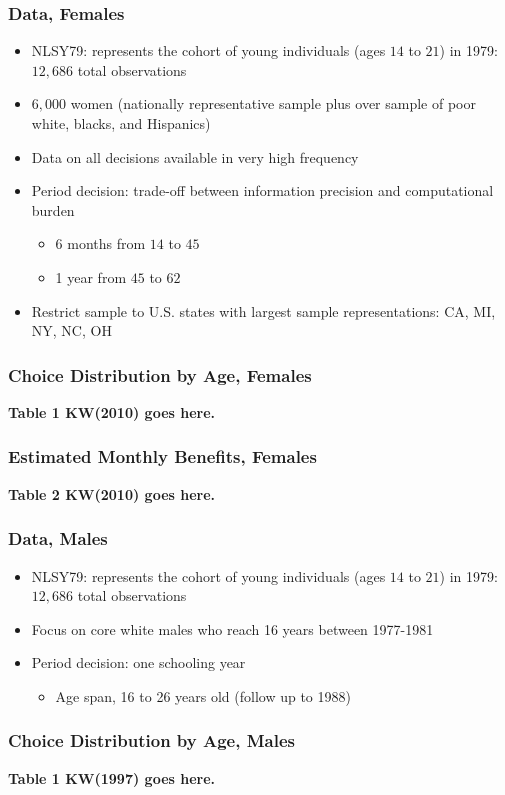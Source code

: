\begin{frame}
	\frametitle{Data, Females}
		\begin{itemize}
			\item NLSY79: represents the cohort of young individuals (ages $14$ to $21$) in 1979: $12,686$ total observations 
			\item $6,000$ women (nationally representative sample plus over sample of poor white, blacks, and Hispanics)
			\item Data on all decisions available in very high frequency
			\item Period decision: trade-off between information precision and computational burden
			\begin{itemize}
				\item 6 months from $14$ to $45$
				\item 1 year from $45$ to $62$
			\end{itemize}						
			\item Restrict sample to U.S. states with largest sample representations: CA, MI, NY, NC, OH
		\end{itemize}
\end{frame}

\begin{frame}
	\frametitle{Choice Distribution by Age, Females}
	\textbf{Table 1 KW(2010) goes here.}
\end{frame}

\begin{frame}
	\frametitle{Estimated Monthly Benefits, Females}
	\textbf{Table 2 KW(2010) goes here.}
\end{frame}

\begin{frame}
	\frametitle{Data, Males}
		\begin{itemize}
			\item NLSY79: represents the cohort of young individuals (ages $14$ to $21$) in 1979: $12,686$ total observations
			\item Focus on core white males who reach 16 years between 1977-1981
			\item Period decision: one schooling year
			\begin{itemize}
				\item Age span, 16 to 26 years old (follow up to 1988)
			\end{itemize}						
		\end{itemize}
\end{frame}

\begin{frame}
	\frametitle{Choice Distribution by Age, Males}
	\textbf{Table 1 KW(1997) goes here.}
\end{frame}

